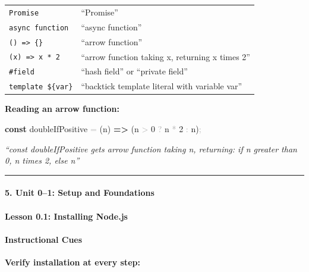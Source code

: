 \documentclass[
  justified,
  openright,
]{tufte-book}
\let\subsection\paragraph
\let\paragraph\paragraph
\newcommand{\KeywordTok}[1]{\textcolor{CodeKeyword}{\textbf{#1}}}  %
\newcommand{\CodeNumTok}[1]{\textcolor{CodeNumber}{#1}}             %
\newcommand{\OperatorTok}[1]{\textcolor{DarkGray}{#1}}              %
\newenvironment{Shaded}{%
  \begin{mdframed}[style=TufteCode]%
}{%
  \end{mdframed}%
}
\let\subsection\paragraph
\let\paragraph\paragraph
\begin{document}
\begin{fullwidth}
{\begin{longtable}[]{@{}
  >{\raggedright\arraybackslash}p{}
  >{\raggedright\arraybackslash}p{}@{}}
\texttt{Promise} & ``Promise'' \\
\texttt{async\ function} & ``async function'' \\
\texttt{()\ =\textgreater{}\ \{\}} & ``arrow function'' \\
\texttt{(x)\ =\textgreater{}\ x\ *\ 2} & ``arrow function taking x,
returning x times 2'' \\
\texttt{\#field} & ``hash field'' or ``private field'' \\
\texttt{\textasciigrave{}template\ \$\{var\}\textasciigrave{}} &
``backtick template literal with variable var'' \\
\end{longtable}
}
\end{fullwidth}

\textbf{Reading an arrow function:}

\begin{Shaded}
\begin{Highlighting}[]
\KeywordTok{const} doubleIfPositive \OperatorTok{=} (n) \KeywordTok{=\textgreater{}} (n \OperatorTok{\textgreater{}} \CodeNumTok{0} \OperatorTok{?} n \OperatorTok{*} \CodeNumTok{2} \OperatorTok{:} n)\OperatorTok{;}
\end{Highlighting}
\end{Shaded}

\emph{``const doubleIfPositive gets arrow function taking n, returning:
if n greater than 0, n times 2, else n''}

\begin{center}\rule{0.5\linewidth}{0.5pt}\end{center}

\subsection{5. Unit 0--1: Setup and
Foundations}\label{unit-01-setup-and-foundations}

\subsection{Lesson 0.1: Installing
Node.js}\label{lesson-0.1-installing-node.js}

\paragraph{Instructional Cues}\label{instructional-cues-11}

\textbf{Verify installation at every step:}
\end{document}
